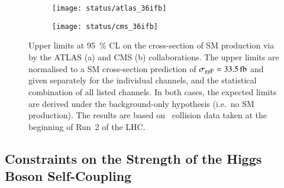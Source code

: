 \begin{figure}[htbp]
  \centering

  \begin{subfigure}[b]{0.9\textwidth}
    \centering

    \texttt{[image: status/atlas\_36ifb]}

  \end{subfigure}

  \vspace{0.5em}

  \begin{subfigure}[b]{0.9\textwidth}
    \centering

    \texttt{[image: status/cms\_36ifb]}

  \end{subfigure}

  \caption{Upper limits at \SI{95}{\percent} CL on the cross-section of SM \HH
    production via \ggF by the ATLAS (a) and CMS (b) collaborations. The upper
    limits are normalised to a SM cross-section prediction of
    $\sigma_{\ggF} = \SI{33.5}{\femto\barn}$ and given separately for the
    individual channels, and the statistical combination of all listed
    channels. In both cases, the expected limits are derived under the
    background-only hypothesis (i.e.\ no SM \HH production). The results are
    based on \pp~collision data taken at the beginning of Run~2 of the LHC.}%
  \label{fig:prior_status_smhh}
\end{figure}


\subsection*{Constraints on the Strength of the Higgs Boson Self-Coupling}%
\label{sec:past_results_klambda}


